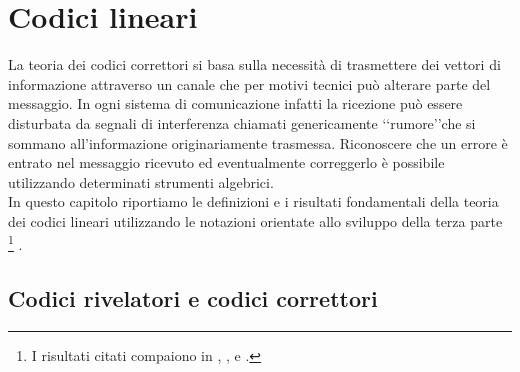 \chapter{Codici lineari} \label{cap:codiciLineari}

La teoria dei codici correttori si basa sulla necessità di trasmettere dei vettori di informazione attraverso un canale che per motivi tecnici può alterare parte del messaggio. In ogni sistema di comunicazione infatti la ricezione può essere disturbata da segnali di interferenza chiamati genericamente \lq\lq rumore\rq\rq che si sommano all'informazione originariamente trasmessa.
Riconoscere che un errore è entrato nel messaggio ricevuto ed eventualmente correggerlo è possibile utilizzando determinati strumenti algebrici. \\
In questo capitolo riportiamo le definizioni e i risultati fondamentali della teoria dei codici lineari utilizzando le notazioni orientate allo sviluppo della terza parte
\footnote{I risultati citati compaiono in \cite{berardi}, \cite{lint}, \cite{blahut} e \cite{sloane}.}
.

\section{Codici rivelatori e codici correttori}

